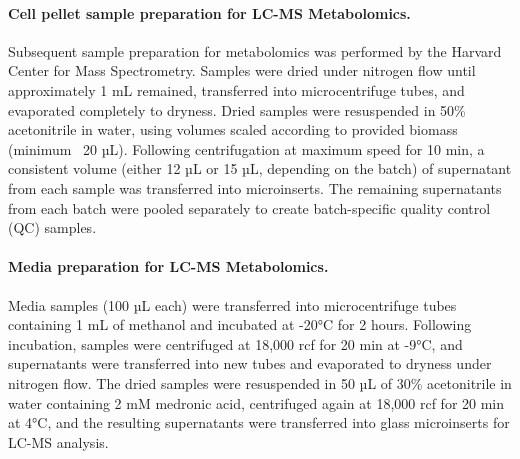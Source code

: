 \paragraph{Cell pellet sample preparation for LC-MS Metabolomics.}
Subsequent sample preparation for metabolomics was performed by the Harvard Center for Mass Spectrometry. Samples were dried under nitrogen flow until approximately 1 mL remained, transferred into microcentrifuge tubes, and evaporated completely to dryness. Dried samples were resuspended in 50\% acetonitrile in water, using volumes scaled according to provided biomass (minimum ~20 µL). Following centrifugation at maximum speed for 10 min, a consistent volume (either 12 µL or 15 µL, depending on the batch) of supernatant from each sample was transferred into microinserts. The remaining supernatants from each batch were pooled separately to create batch-specific quality control (QC) samples.

\paragraph{Media preparation for LC-MS Metabolomics.}
Media samples (100 µL each) were transferred into microcentrifuge tubes containing 1 mL of methanol and incubated at -20°C for 2 hours. Following incubation, samples were centrifuged at 18,000 rcf for 20 min at -9°C, and supernatants were transferred into new tubes and evaporated to dryness under nitrogen flow. The dried samples were resuspended in 50 µL of 30\% acetonitrile in water containing 2 mM medronic acid, centrifuged again at 18,000 rcf for 20 min at 4°C, and the resulting supernatants were transferred into glass microinserts for LC-MS analysis.

